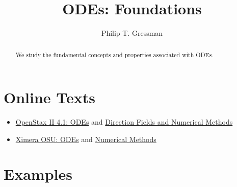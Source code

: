\documentclass{ximera}
\title{ODEs: Foundations}
\author{Philip T. Gressman}
\begin{document}
\begin{abstract}
We study the fundamental concepts and properties associated with ODEs.
\end{abstract}
\maketitle

\section*{Online Texts}
\begin{itemize}
\item \href{https://openstax.org/books/calculus-volume-2/pages/4-1-basics-of-differential-equations}{OpenStax II 4.1: ODEs} and \href{https://openstax.org/books/calculus-volume-2/pages/4-2-direction-fields-and-numerical-methods}{Direction Fields and Numerical Methods}
\item \href{https://ximera.osu.edu/mooculus/calculus2/differentialEquations/titlePage}{Ximera OSU: ODEs} and \href{https://ximera.osu.edu/mooculus/calculus2/numericalMethods/titlePage}{Numerical Methods}
\end{itemize}

\section*{Examples}

\begin{example}

\end{example}

\begin{example}

\end{example}
\end{document}
